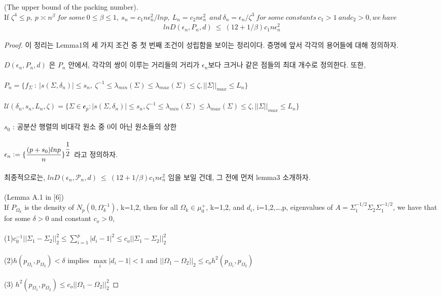 (The upper bound of the packing number).\\
If ${\zeta}^4 \leq p, \ p \asymp n^{\beta} \ for\ some\ 0 \leq \beta \leq 1,\ s_n = c_1n \epsilon_n^2/lnp,\ L_n = c_2n \epsilon_n^2\ \ and\ \delta_n=\epsilon_n/\zeta^3\ for\ some\ constants\ c_1>1\ and c_2>0, we\ have$
\begin{align*}
    lnD(\epsilon_n,P_n,d) \ \leq \ (12+1/\beta)c_1n\epsilon_n^2
\end{align*}
\begin{proof}
이 정리는 Lemma1의 세 가지 조건 중 첫 번째 조건이 성립함을 보이는 정리이다. 증명에 앞서 각각의 용어들에 대해 정의하자.\\
\\
$D(\epsilon_n,P_n,d)$ 은 $P_n$ 안에서, 각각의 쌍이 이루는 거리들의 거리가 $\epsilon_n$보다 크거나 같은 점들의 최대 개수로 정의한다. 또한,\\
\\
$P_n=\{f_\Sigma \ :\ |s(\Sigma,\delta_n)|\leq s_n, \ \zeta^{-1} \leq \lambda_{min}(\Sigma) \leq \lambda_{max}(\Sigma) \leq \zeta,||\Sigma||_{max} \leq L_n  \}$\\
\\
$\mathcal{U}(\delta_n,s_n,L_n,\zeta)=\{\Sigma \in \mathcal{c}_p : |s(\Sigma,\delta_n)|\leq s_n,\zeta^{-1} \leq \lambda_{min}(\Sigma) \leq \lambda_{max}(\Sigma) \leq \zeta,||\Sigma||_{max} \leq L_n \} $\\ 
\\
$s_0$ : 공분산 행렬의 비대각 원소 중 0이 아닌 원소들의 상한\\
\\
$\epsilon_n \mathrel{\mathop:}= \{\dfrac{(p+s_0)lnp}{n}\}^{\dfrac{1}{2}}$
\noindent
라고 정의하자.\\
\\
최종적으로는, $lnD(\epsilon_n,\mathcal{P}_n,d)\ \leq \ (12+1/\beta)c_1n\epsilon_n^2$ 임을 보일 건데, 그 전에 먼저 lemma3 소개하자.\\
\\
\noindent
[Lemma3](Lemma A.1 in [6])
\\
If  $P_{\Omega_{k}}$ is the density of $N_p(0,\Omega_{k}^{-1})$, k=1,2, then for all $\Omega_k \in \mu_{0}^+$, k=1,2, and $d_i$, i=1,2,…,p, eigenvalues of $A=\Sigma_1^{-1/2}\Sigma_2\Sigma_1^{-1/2}$, we have that for some $\delta > 0$ and constant $c_o>0$,\\
\\
(1)$c_0^{-1}||\Sigma_1-\Sigma_2||_2^2\leq \sum_{i=1}^{p}|d_i-1|^2\leq c_o||\Sigma_1-\Sigma_2||_2^2$\\
\\
(2)$h(p_{\Omega_{1}},p_{\Omega_{2}})<\delta$ implies $\max\limits_i|d_i-1|<1$ and $||\Omega_1-\Omega_2||_2 \leq c_oh^2(p_{\Omega_{1}},p_{\Omega_{2}})$\\
\\
(3) $h^2(p_{\Omega_{1}},p_{\Omega_{2}}) \leq c_o||\Omega_1-\Omega_2||_2^2$


\end{proof}
